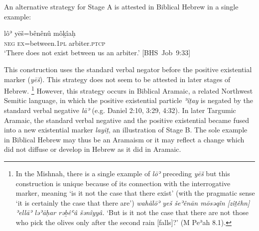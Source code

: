 \documentclass[output=paper,colorlinks,citecolor=brown,draft,draftmode]{langscibook}
\begin{document}
\noindent
An alternative strategy for Stage A is attested in Biblical Hebrew in a single example:
%
\begin{exe}\ex \label{ex:heb-arbiter} \gll lôʾ yēš=bênênû môḵîaḥ \\
\textsc{neg} \textsc{ex}=between.\textsc{1pl}  arbiter.\textsc{ptcp} \\
\glt `There does not exist between us an arbiter.'
\mbox{[BHS Job 9:33]} \end{exe}
%
This construction uses the standard verbal negator before the positive
existential marker (\textit{yēš}). This strategy does not seem to be
attested in later stages of Hebrew.%
%
    \footnote{In the Mishnah, there is a single example of \textit{lōʾ}
    preceding \textit{yēš} but this construction is unique because of its
    connection with the interrogative marker, meaning `is it not the case
    that there exist' (with the pragmatic sense `it is certainly the case
    that there are') \textit{wahălōʾ yeš šeʾênān
    mōsǝqîn [zîṯêhn] ʾellāʾ ləʾāḥar
    rəḇêʿâ šənîyyâ.} `But is it not the case that there
    are not those who pick the olives only after the second rain [falls]?'
    (M Peʾah 8.1).} %
%
However, this strategy occurs in Biblical Aramaic, a related Northwest
Semitic language, in which the positive existential particle \textit{ʾîṯay}
is negated by the standard verbal negative \textit{lāʾ} (e.g. Daniel 2:10,
3:29, 4:32). In later Targumic Aramaic, the standard verbal negative and
the positive existential became fused into a new existential marker
\textit{layiṯ}, an illustration of Stage B. The sole example in Biblical
Hebrew may thus be an Aramaism \parencite[see][xlvi-xlvii]{DriverGray1921} or
it may reflect a change which did not diffuse or develop in Hebrew as it
did in Aramaic.
\end{document}
